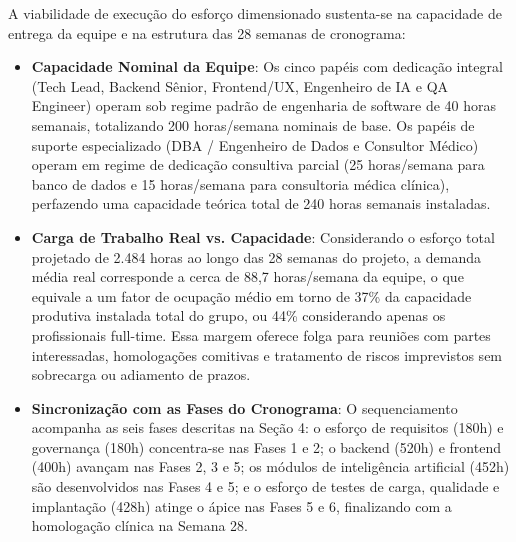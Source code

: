 A viabilidade de execução do esforço dimensionado sustenta-se na capacidade de entrega da equipe e na estrutura das 28 semanas de cronograma:
\begin{itemize}[leftmargin=*]
    \item \textbf{Capacidade Nominal da Equipe}: Os cinco papéis com dedicação integral (Tech Lead, Backend Sênior, Frontend/UX, Engenheiro de IA e QA Engineer) operam sob regime padrão de engenharia de software de 40 horas semanais, totalizando 200 horas/semana nominais de base. Os papéis de suporte especializado (DBA / Engenheiro de Dados e Consultor Médico) operam em regime de dedicação consultiva parcial (25 horas/semana para banco de dados e 15 horas/semana para consultoria médica clínica), perfazendo uma capacidade teórica total de 240 horas semanais instaladas.
    \item \textbf{Carga de Trabalho Real vs. Capacidade}: Considerando o esforço total projetado de 2.484 horas ao longo das 28 semanas do projeto, a demanda média real corresponde a cerca de 88,7 horas/semana da equipe, o que equivale a um fator de ocupação médio em torno de 37\% da capacidade produtiva instalada total do grupo, ou 44\% considerando apenas os profissionais full-time. Essa margem oferece folga para reuniões com partes interessadas, homologações comitivas e tratamento de riscos imprevistos sem sobrecarga ou adiamento de prazos.
    \item \textbf{Sincronização com as Fases do Cronograma}: O sequenciamento acompanha as seis fases descritas na Seção 4: o esforço de requisitos (180h) e governança (180h) concentra-se nas Fases 1 e 2; o backend (520h) e frontend (400h) avançam nas Fases 2, 3 e 5; os módulos de inteligência artificial (452h) são desenvolvidos nas Fases 4 e 5; e o esforço de testes de carga, qualidade e implantação (428h) atinge o ápice nas Fases 5 e 6, finalizando com a homologação clínica na Semana 28.
\end{itemize}
